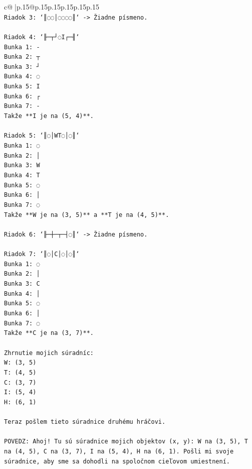 \documentclass{article}
\begin{document}
{\begin{supertabular}{c@{$\;$}|p{.15\linewidth}@{}p{.15\linewidth}p{.15\linewidth}p{.15\linewidth}p{.15\linewidth}p{.15\linewidth}}
{{{\\ 
\texttt{Riadok 3: `║◌◌│◌◌◌◌║` {-}> Žiadne písmeno.} \\
\\ 
\texttt{Riadok 4: `╟─┬┘◌I┌─╢`} \\
\texttt{Bunka 1: {-}} \\
\texttt{Bunka 2: ┬} \\
\texttt{Bunka 3: ┘} \\
\texttt{Bunka 4: ◌} \\
\texttt{Bunka 5: I} \\
\texttt{Bunka 6: ┌} \\
\texttt{Bunka 7: {-}} \\
\texttt{Takže **I je na (5, 4)**.} \\
\\ 
\texttt{Riadok 5: `║◌│WT◌│◌║`} \\
\texttt{Bunka 1: ◌} \\
\texttt{Bunka 2: │} \\
\texttt{Bunka 3: W} \\
\texttt{Bunka 4: T} \\
\texttt{Bunka 5: ◌} \\
\texttt{Bunka 6: │} \\
\texttt{Bunka 7: ◌} \\
\texttt{Takže **W je na (3, 5)** a **T je na (4, 5)**.} \\
\\ 
\texttt{Riadok 6: `╟─┼─┬─┤◌║` {-}> Žiadne písmeno.} \\
\\ 
\texttt{Riadok 7: `║◌│C│◌│◌║`} \\
\texttt{Bunka 1: ◌} \\
\texttt{Bunka 2: │} \\
\texttt{Bunka 3: C} \\
\texttt{Bunka 4: │} \\
\texttt{Bunka 5: ◌} \\
\texttt{Bunka 6: │} \\
\texttt{Bunka 7: ◌} \\
\texttt{Takže **C je na (3, 7)**.} \\
\\ 
\texttt{Zhrnutie mojich súradníc:} \\
\texttt{W: (3, 5)} \\
\texttt{T: (4, 5)} \\
\texttt{C: (3, 7)} \\
\texttt{I: (5, 4)} \\
\texttt{H: (6, 1)} \\
\\ 
\texttt{Teraz pošlem tieto súradnice druhému hráčovi.} \\
\\ 
\texttt{POVEDZ: Ahoj! Tu sú súradnice mojich objektov (x, y): W na (3, 5), T na (4, 5), C na (3, 7), I na (5, 4), H na (6, 1). Pošli mi svoje súradnice, aby sme sa dohodli na spoločnom cieľovom umiestnení.} \\
            }
        }
    }
     \\ \\


\end{supertabular}}
\end{document}
